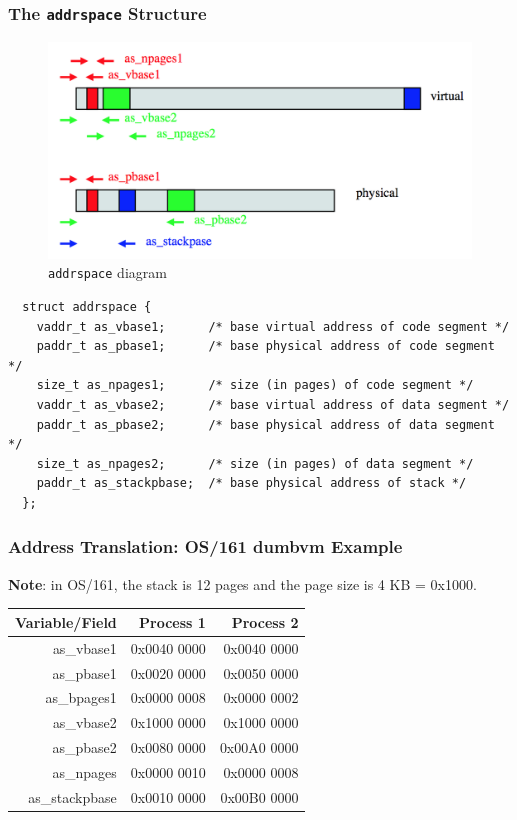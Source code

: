 \documentclass[12pt]{article}
\theoremstyle{plain}
\theoremstyle{definition}
\begin{document}
\subsubsection{The \texttt{addrspace} Structure}
\begin{figure}[H]
  \centering
  \includegraphics[scale=0.7]{pictures/addrspace.png}
  \caption{\texttt{addrspace} diagram}
  \label{fig:addrspace}
\end{figure}
\begin{verbatim}
  struct addrspace {
    vaddr_t as_vbase1;      /* base virtual address of code segment */
    paddr_t as_pbase1;      /* base physical address of code segment */
    size_t as_npages1;      /* size (in pages) of code segment */
    vaddr_t as_vbase2;      /* base virtual address of data segment */
    paddr_t as_pbase2;      /* base physical address of data segment */
    size_t as_npages2;      /* size (in pages) of data segment */
    paddr_t as_stackpbase;  /* base physical address of stack */
  };
\end{verbatim}

\subsubsection{Address Translation: OS/161 dumbvm Example}
\textbf{Note}: in OS/161, the stack is 12 pages and the page size is 4 KB = 0x1000. \\
\begin{table}[H]
  \vspace{-20pt}
  \centering
  \begin{tabular}{|r|r|r|}
  \hline
  Variable/Field & Process 1 & Process 2 \\ \hline \hline
  as\_vbase1 & 0x0040 0000 & 0x0040 0000 \\ \hline
  as\_pbase1 & 0x0020 0000 & 0x0050 0000 \\ \hline
  as\_bpages1 & 0x0000 0008 & 0x0000 0002 \\ \hline
  as\_vbase2 & 0x1000 0000 & 0x1000 0000 \\ \hline
  as\_pbase2 & 0x0080 0000 & 0x00A0 0000 \\ \hline
  as\_npages & 0x0000 0010 & 0x0000 0008 \\ \hline
  as\_stackpbase & 0x0010 0000 & 0x00B0 0000 \\ \hline
  \end{tabular}
\end{table}
\end{document}
